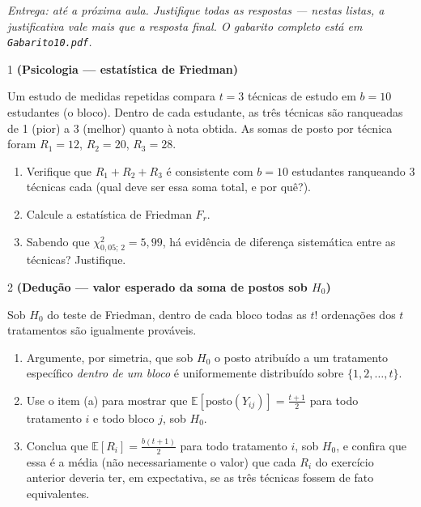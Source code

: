 \documentclass[11pt]{article}
\begin{document}

\noindent \textit{Entrega: até a próxima aula. Justifique todas as respostas — nestas listas, a
justificativa vale mais que a resposta final. O gabarito completo está em \texttt{Gabarito10.pdf}.}

\begin{questao}{1} \textbf{(Psicologia --- estatística de Friedman)}

Um estudo de medidas repetidas compara $t=3$ técnicas de estudo em $b=10$ estudantes (o bloco).
Dentro de cada estudante, as três técnicas são ranqueadas de 1 (pior) a 3 (melhor) quanto à nota
obtida. As somas de posto por técnica foram $R_1=12$, $R_2=20$, $R_3=28$.

\begin{enumerate}[label=(\alph*)]
  \item Verifique que $R_1+R_2+R_3$ é consistente com $b=10$ estudantes ranqueando 3 técnicas
    cada (qual deve ser essa soma total, e por quê?).
  \item Calcule a estatística de Friedman $F_r$.
  \item Sabendo que $\chi^2_{0{,}05;\,2}=5{,}99$, há evidência de diferença sistemática entre as
    técnicas? Justifique.
\end{enumerate}
\end{questao}

\begin{questao}{2} \textbf{(Dedução --- valor esperado da soma de postos sob $H_0$)}

Sob $H_0$ do teste de Friedman, dentro de cada bloco todas as $t!$ ordenações dos $t$
tratamentos são igualmente prováveis.

\begin{enumerate}[label=(\alph*)]
  \item Argumente, por simetria, que sob $H_0$ o posto atribuído a um tratamento específico
    \emph{dentro de um bloco} é uniformemente distribuído sobre $\{1,2,\dots,t\}$.
  \item Use o item (a) para mostrar que $\mathbb E[\text{posto}(Y_{ij})] = \frac{t+1}{2}$ para
    todo tratamento $i$ e todo bloco $j$, sob $H_0$.
  \item Conclua que $\mathbb E[R_i] = \frac{b(t+1)}{2}$ para todo tratamento $i$, sob $H_0$, e
    confira que essa é a média (não necessariamente o valor) que cada $R_i$ do exercício anterior
    deveria ter, em expectativa, se as três técnicas fossem de fato equivalentes.
\end{enumerate}
\end{questao}
\end{document}
